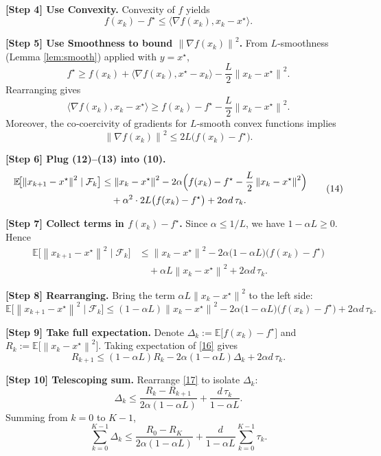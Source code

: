 \documentclass{article}
\newcommand{\EE}{\mathbb{E}}
\newcommand{\norm}[1]{\left\|#1\right\|}
\newcommand{\inner}[2]{\langle #1,#2\rangle}
\begin{document}
\noindent\textbf{[Step 4] Use Convexity.}  
Convexity of $f$ yields
\[
f(x_k)-f^\star\le\inner{\nabla f(x_k)}{x_k-x^\star}.
\tag{11}
\]

\noindent\textbf{[Step 5] Use Smoothness to bound $\norm{\nabla f(x_k)}^2$.}  
From $L$‑smoothness (Lemma \ref{lem:smooth}) applied with $y=x^\star$,
\[
f^\star\ge f(x_k)+\inner{\nabla f(x_k)}{x^\star-x_k}
-\frac{L}{2}\norm{x_k-x^\star}^2 .
\]
Rearranging gives
\[
\inner{\nabla f(x_k)}{x_k-x^\star}\ge f(x_k)-f^\star-\frac{L}{2}\norm{x_k-x^\star}^2 .
\tag{12}
\]
Moreover, the co‑coercivity of gradients for $L$‑smooth convex functions implies
\[
\norm{\nabla f(x_k)}^2\le 2L\bigl(f(x_k)-f^\star\bigr).
\tag{13}
\]

\noindent\textbf{[Step 6] Plug (12)–(13) into (10).}  
\[
\begin{aligned}
\EE\!\bigl[\norm{x_{k+1}-x^\star}^2\mid\mathcal F_k\bigr]
&\le \norm{x_k-x^\star}^2
-2\alpha\Bigl(f(x_k)-f^\star-\frac{L}{2}\norm{x_k-x^\star}^2\Bigr)   \\
&\quad+ \alpha^2\cdot 2L\bigl(f(x_k)-f^\star\bigr)
+2\alpha d\,\tau_k .
\end{aligned}
\tag{14}
\]

\noindent\textbf{[Step 7] Collect terms in $f(x_k)-f^\star$.}  
Since $\alpha\le 1/L$, we have $1- \alpha L\ge 0$. Hence
\[
\begin{aligned}
\EE\!\bigl[\norm{x_{k+1}-x^\star}^2\mid\mathcal F_k\bigr]
&\le \norm{x_k-x^\star}^2
-2\alpha\bigl(1-\alpha L\bigr)\bigl(f(x_k)-f^\star\bigr)   \\
&\quad+ \alpha L \norm{x_k-x^\star}^2
+2\alpha d\,\tau_k .
\end{aligned}
\tag{15}
\]

\noindent\textbf{[Step 8] Rearranging.}  
Bring the term $\alpha L \norm{x_k-x^\star}^2$ to the left side:
\[
\EE\!\bigl[\norm{x_{k+1}-x^\star}^2\mid\mathcal F_k\bigr]
\le (1-\alpha L)\norm{x_k-x^\star}^2
-2\alpha\bigl(1-\alpha L\bigr)\bigl(f(x_k)-f^\star\bigr)
+2\alpha d\,\tau_k .
\tag{16}
\]

\noindent\textbf{[Step 9] Take full expectation.}  
Denote $\Delta_k:=\EE\!\bigl[f(x_k)-f^\star\bigr]$ and $R_k:=\EE\!\bigl[\norm{x_k-x^\star}^2\bigr]$.  
Taking expectation of \eqref{16} gives
\[
R_{k+1}\le (1-\alpha L)R_k-2\alpha(1-\alpha L)\Delta_k+2\alpha d\,\tau_k .
\tag{17}
\]

\noindent\textbf{[Step 10] Telescoping sum.}  
Rearrange \eqref{17} to isolate $\Delta_k$:
\[
\Delta_k\le \frac{R_k-R_{k+1}}{2\alpha(1-\alpha L)}+\frac{d\,\tau_k}{1-\alpha L}.
\tag{18}
\]
Summing from $k=0$ to $K-1$,
\[
\sum_{k=0}^{K-1}\Delta_k
\le \frac{R_0-R_{K}}{2\alpha(1-\alpha L)}+\frac{d}{1-\alpha L}\sum_{k=0}^{K-1}\tau_k .
\tag{19}
\]
\end{document}
